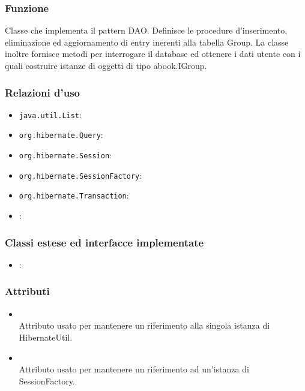\subsubsection*{Funzione}
Classe che implementa il pattern DAO. Definisce le procedure d’inserimento, eliminazione ed aggiornamento di entry inerenti alla tabella Group. La classe inoltre fornisce metodi per interrogare il database ed ottenere i dati utente con i quali costruire istanze di oggetti di tipo abook.IGroup.

\subsubsection*{Relazioni d'uso}

\begin{itemize}
	\item \texttt{java.util.List}:
	\item \texttt{org.hibernate.Query}:
	\item \texttt{org.hibernate.Session}:
	\item \texttt{org.hibernate.SessionFactory}:
	\item \texttt{org.hibernate.Transaction}:
	\item {}:
\end{itemize}

\subsubsection*{Classi estese ed interfacce implementate}
\begin{itemize}
	\item {}:
\end{itemize}

\subsubsection*{Attributi}

\begin{itemize}
	\item{}\\
	Attributo usato per mantenere un riferimento alla singola istanza di HibernateUtil.
	\item{}\\
	Attributo usato per mantenere un riferimento ad un'istanza di SessionFactory.
\end{itemize}

